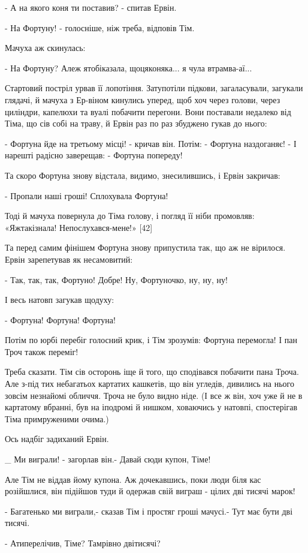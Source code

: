 - А на якого коня ти поставив? - спитав Ервін.

- На Фортуну! - голосніше, ніж треба, відповів Тім.

Мачуха аж скинулась:

- На Фортуну? Алеж ятобіказала, щоцяконяка... я чула втрамва-аї...

Стартовий постріл урвав її лопотіння. Затупотіли підкови, загаласували, загукали глядачі, й мачуха з Ер-віном кинулись уперед, щоб хоч через голови, через циліндри, капелюхи та вуалі побачити перегони. Вони поставали недалеко від Тіма, що сів собі на траву, й Ервін раз по раз збуджено гукав до нього:

- Фортуна йде на третьому місці! - кричав він. Потім: - Фортуна наздоганяє! - І нарешті радісно заверещав: - Фортуна попереду!

Та скоро Фортуна знову відстала, видимо, знесилившись, і Ервін закричав:

- Пропали наші гроші! Сплохувала Фортуна!

Тоді й мачуха повернула до Тіма голову, і погляд її ніби промовляв: «Яжтакізнала! Непослухався-мене!» [42]

Та перед самим фінішем Фортуна знову припустила так, що аж не вірилося. Ервін зарепетував як несамовитий:

- Так, так, так, Фортуно! Добре! Ну, Фортуночко, ну, ну, ну!

І весь натовп загукав щодуху:

- Фортуна! Фортуна! Фортуна!

Потім по юрбі перебіг голосний крик, і Тім зрозумів: Фортуна перемогла! І пан Троч також переміг!

Треба сказати. Тім сів осторонь іще й того, що сподівався побачити пана Троча. Але з-під тих небагатьох картатих кашкетів, що він угледів, дивились на нього зовсім незнайомі обличчя. Троча не було видно ніде. (І все ж він, хоч уже й не в картатому вбранні, був на іподромі й нишком, ховаючись у натовпі, спостерігав Тіма примруженими очима.)

Ось надбіг задиханий Ервін.

_ Ми виграли! - загорлав він.- Давай сюди купон, Тіме!

Але Тім не віддав йому купона. Аж дочекавшись, поки люди біля кас розійшлися, він підійшов туди й одержав свій виграш - цілих дві тисячі марок!

- Багатенько ми виграли,- сказав Тім і простяг гроші мачусі.- Тут має бути дві тисячі.

- Атиперелічив, Тіме? Тамрівно двітисячі?

